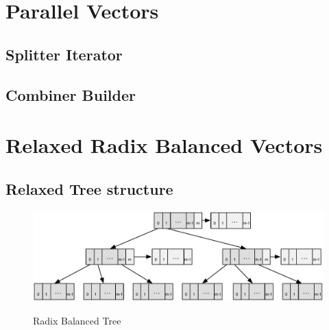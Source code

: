 
\section{Parallel Vectors}




\subsection{Splitter Iterator}




\subsection{Combiner Builder}




\section{Relaxed Radix Balanced Vectors}


\subsection{Relaxed Tree structure}

\begin{figure}[h!]
  \centering
  \includegraphics[width=\textwidth]{Figures/Relaxed_Radix_balanced}
  \label{Relaxed_Radix_balanced}
  \caption{Radix Balanced Tree}
\end{figure}


